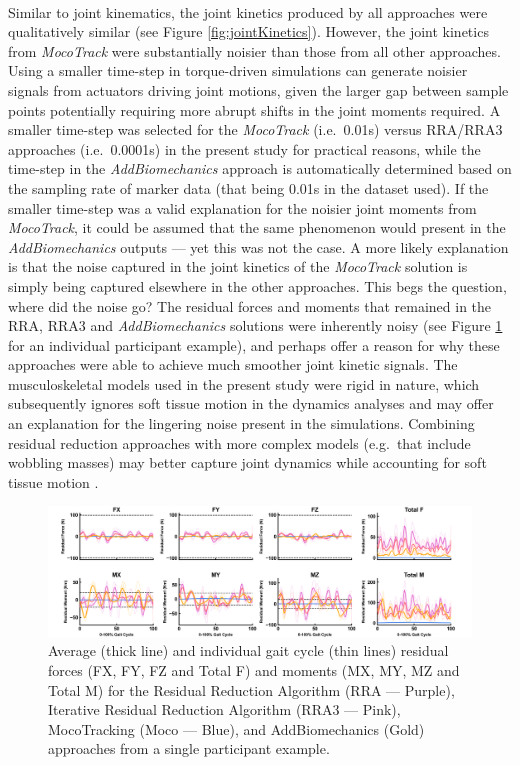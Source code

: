 \documentclass[]{elsarticle} %
\begin{document}
~

Similar to joint kinematics, the joint kinetics produced by all
approaches were qualitatively similar (see Figure
\ref{fig:jointKinetics}). However, the joint kinetics from
\emph{MocoTrack} were substantially noisier than those from all other
approaches. Using a smaller time-step in torque-driven simulations can
generate noisier signals from actuators driving joint motions, given the
larger gap between sample points potentially requiring more abrupt
shifts in the joint moments required. A smaller time-step was selected
for the \emph{MocoTrack} (i.e.~0.01s) versus RRA/RRA3 approaches
(i.e.~0.0001s) in the present study for practical reasons, while the
time-step in the \emph{AddBiomechanics} approach is automatically
determined based on the sampling rate of marker data (that being 0.01s
in the dataset used). If the smaller time-step was a valid explanation
for the noisier joint moments from \emph{MocoTrack}, it could be assumed
that the same phenomenon would present in the \emph{AddBiomechanics}
outputs --- yet this was not the case. A more likely explanation is that
the noise captured in the joint kinetics of the \emph{MocoTrack}
solution is simply being captured elsewhere in the other approaches.
This begs the question, where did the noise go? The residual forces and
moments that remained in the RRA, RRA3 and \emph{AddBiomechanics}
solutions were inherently noisy (see Figure
\ref{fig:sampleSubjectResiduals} for an individual participant example),
and perhaps offer a reason for why these approaches were able to achieve
much smoother joint kinetic signals. The musculoskeletal models used in
the present study were rigid in nature, which subsequently ignores soft
tissue motion in the dynamics analyses and may offer an explanation for
the lingering noise present in the simulations. Combining residual
reduction approaches with more complex models (e.g.~that include
wobbling masses) may better capture joint dynamics while accounting for
soft tissue motion \citep{Masters2022}.

\begin{figure}

{\centering \includegraphics[width=1\linewidth]{../results/HamnerDelpDataset/figures/subject01_run5_residualsComparison} 

}

\caption{Average (thick line) and individual gait cycle (thin lines) residual forces (FX, FY, FZ and Total F) and moments (MX, MY, MZ and Total M) for the Residual Reduction Algorithm (RRA — Purple), Iterative Residual Reduction Algorithm  (RRA3 — Pink), MocoTracking (Moco — Blue), and AddBiomechanics (Gold) approaches from a single participant example.}\label{fig:sampleSubjectResiduals}
\end{figure}
\end{document}
